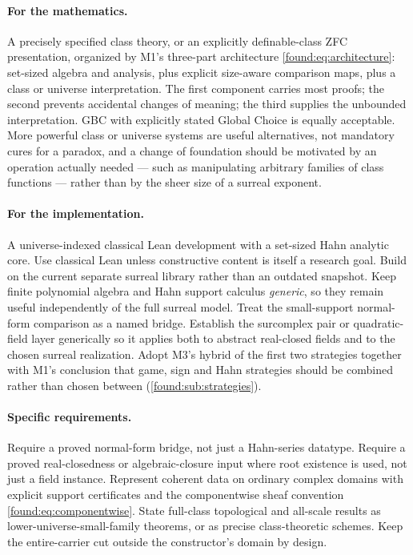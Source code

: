 \documentclass[11pt,letterpaper]{article}
\numberwithin{equation}{section}
\theoremstyle{definition}
\theoremstyle{remark}
\begin{document}
\paragraph{For the mathematics.} A precisely specified class theory, or an
explicitly definable-class ZFC presentation, organized by M1's three-part
architecture \eqref{found:eq:architecture}: set-sized algebra and analysis, plus
explicit size-aware comparison maps, plus a class or universe interpretation.
The first component carries most proofs; the second prevents accidental changes
of meaning; the third supplies the unbounded interpretation. GBC with explicitly
stated Global Choice is equally acceptable. More powerful class or universe
systems are useful alternatives, not mandatory cures for a paradox, and a change
of foundation should be motivated by an operation actually needed --- such as
manipulating arbitrary families of class functions --- rather than by the sheer
size of a surreal exponent.

\paragraph{For the implementation.} A universe-indexed classical Lean
development with a set-sized Hahn analytic core. Use classical Lean unless
constructive content is itself a research goal. Build on the current separate
surreal library rather than an outdated snapshot. Keep finite polynomial algebra
and Hahn support calculus \emph{generic}, so they remain useful independently of
the full surreal model. Treat the small-support normal-form comparison as a named
bridge. Establish the surcomplex pair or quadratic-field layer generically so it
applies both to abstract real-closed fields and to the chosen surreal
realization. Adopt M3's hybrid of the first two strategies together with M1's
conclusion that game, sign and Hahn strategies should be combined rather than
chosen between (\cref{found:sub:strategies}).

\paragraph{Specific requirements.} Require a proved normal-form bridge, not just
a Hahn-series datatype. Require a proved real-closedness or algebraic-closure
input where root existence is used, not just a field instance. Represent coherent
data on ordinary complex domains with explicit support certificates and the
componentwise sheaf convention \eqref{found:eq:componentwise}. State full-class
topological and all-scale results as lower-universe-small-family theorems, or as
precise class-theoretic schemes. Keep the entire-carrier cut outside the
constructor's domain by design.
\end{document}
